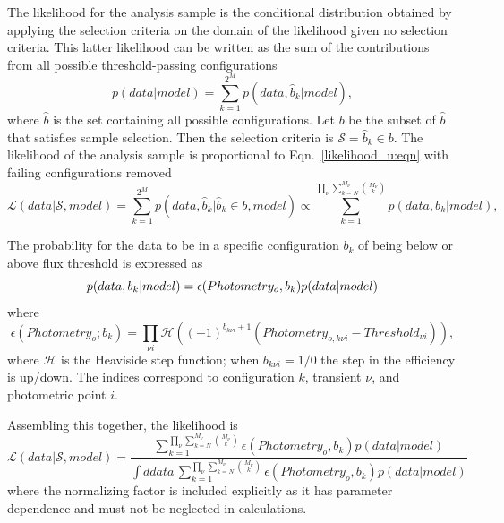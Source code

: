 \documentclass[preprint,3p]{elsarticle}
\begin{document}
The likelihood for the analysis
sample is the conditional distribution obtained by applying the selection criteria
on the domain of the likelihood given no selection criteria.  This latter likelihood
can be written
as the sum of the contributions from all possible threshold-passing configurations
\begin{equation}
p(data|model) = \sum_{k=1}^{2^M} p(data, \hat{b}_k| model),
\label{likelihood_u:eqn}
\end{equation}
where $\hat{b}$ is the set containing all possible configurations.
Let $b$ be the subset of $\hat{b}$ 
that satisfies sample selection. Then the selection criteria is $\mathcal{S} = \hat{b}_k
\in b$.
The likelihood of the analysis sample is proportional to Eqn.~\ref{likelihood_u:eqn}
with failing configurations removed
\begin{equation}
\mathcal{L}(data|\mathcal{S}, model) =
\sum_{k=1}^{2^M} p(data, \hat{b}_k| \hat{b}_k
\in b, model) \propto \sum_{k=1}^{\prod_\nu \sum_{k=N}^{M_{\nu}} \binom{M_{\nu}}{k}} p(data, b_k| model),
\end{equation}


The probability for the data to be in a specific configuration $b_k$ of
being below or above flux threshold is expressed
as
\begin{equation}
p(data, b_k| model)  = \epsilon(Photometry_o, b_k)p(data| model)\\
\end{equation}
where
\begin{equation}
\epsilon(Photometry_o; b_{k})= \prod_{\nu i}\mathcal{H}\left((-1)^{b_{k\nu i}+1}(Photometry_{o,k\nu i}-Threshold_{\nu i})\right),
\label{eff:eqn}
\end{equation}
where $\mathcal{H}$ is the Heaviside step function; when $b_{k\nu i}=1/0$ the step in the efficiency
is up/down.  The indices correspond to configuration $k$,
transient $\nu$, and photometric point $i$.

Assembling this together, the likelihood is
\begin{equation}
\mathcal{L}(data|\mathcal{S}, model) = \frac{\sum_{k=1}^{\prod_\nu \sum_{k=N}^{M_{\nu}} \binom{M_{\nu}}{k}} \epsilon(Photometry_o, b_k)p(data| model)}{\int ddata\,
\sum_{k=1}^{\prod_\nu \sum_{k=N}^{M_{\nu}} \binom{M_{\nu}}{k}} \epsilon(Photometry_o, b_k)p(data| model)
}
\end{equation}
where the normalizing factor is included explicitly as it has 
parameter dependence and must not be neglected in calculations.
\end{document}
